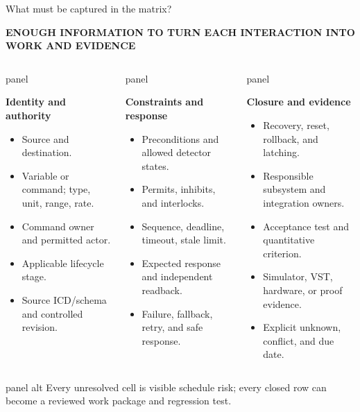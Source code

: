 \documentclass[aspectratio=169,10pt]{beamer}
\newcommand{\eyebrow}[1]{{\color{noircyan}\scriptsize\bfseries #1\par}}
\newcommand{\tightitem}{%
  \setlength{\itemsep}{0.8mm}%
  \setlength{\parskip}{0pt}%
}
\newcommand{\fixedpanel}[4][panel]{%
  \begin{beamercolorbox}[wd=\linewidth,sep=4pt,rounded=true]{#1}
    \begin{minipage}[t][#2][t]{\dimexpr\linewidth-8pt\relax}
      \raggedright
      {\usebeamercolor[fg]{#1}\bfseries #3\par}
      \vspace{0.45mm}
      {\usebeamercolor[fg]{#1}\footnotesize #4\par}
    \end{minipage}
  \end{beamercolorbox}
}
\begin{document}
\begin{frame}[t]{What must be captured in the matrix?}
\eyebrow{ENOUGH INFORMATION TO TURN EACH INTERACTION INTO WORK AND EVIDENCE}
\vspace{1.5mm}

\begin{columns}[T,onlytextwidth]
\fixedpanel{3.7cm}{Identity and authority}{
\begin{itemize}\tightitem
  \item Source and destination.
  \item Variable or command; type, unit, range, rate.
  \item Command owner and permitted actor.
  \item Applicable lifecycle stage.
  \item Source ICD/schema and controlled revision.
\end{itemize}
}

\fixedpanel{3.7cm}{Constraints and response}{
\begin{itemize}\tightitem
  \item Preconditions and allowed detector states.
  \item Permits, inhibits, and interlocks.
  \item Sequence, deadline, timeout, stale limit.
  \item Expected response and independent readback.
  \item Failure, fallback, retry, and safe response.
\end{itemize}
}

\fixedpanel{3.7cm}{Closure and evidence}{
\begin{itemize}\tightitem
  \item Recovery, reset, rollback, and latching.
  \item Responsible subsystem and integration owners.
  \item Acceptance test and quantitative criterion.
  \item Simulator, VST, hardware, or proof evidence.
  \item Explicit unknown, conflict, and due date.
\end{itemize}
}
\end{columns}

\vspace{1mm}
\begin{beamercolorbox}[wd=\linewidth,sep=6pt,rounded=true]{panel alt}
\centering\small
Every unresolved cell is visible schedule risk; every closed row can become a reviewed work package and regression test.
\end{beamercolorbox}
\end{frame}
\end{document}

